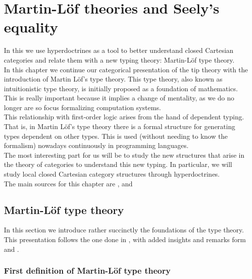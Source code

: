 
\chapter{Martin-L\"of theories and Seely's equality}
\label{chap:5}
\thispagestyle{empty}

In this we use hyperdoctrines as a tool to better understand closed Cartesian categories and relate them with a new typing theory: Martin-Löf type theory.\\

In this chapter we continue our categorical presentation of the tip theory with the introduction of Martin L\"of's type theory. This type theory, also known as intuitionistic type theory, is initially proposed as a foundation of mathematics. This is really important because it implies a change of mentality, as we do no longer are so focus formalizing computation systems. \\

This relationship with first-order logic arises from the hand of dependent typing. That is, in Martin Löf's type theory there is a formal structure for generating types dependent on other types. This is used (without needing to know the formalism) nowadays continuously in programming languages. \\

The most interesting part for us will be to study the new structures that arise in the theory of categories to understand this new typing. In particular, we will study local closed Cartesian category structures through hyperdoctrines. \\

The main sources for this chapter are  \cite{seely1984locally}, \cite{martinlof1973intuitionistic}  and \cite{mac2013categories}



\section{Martin-Löf type theory}

In this section we introduce rather succinctly the foundations of the type theory. This presentation follows the one done in \cite{seely1984locally}, with added insights and remarks form \cite{martinlof1973intuitionistic} and \cite{sep-type-theory-intuitionistic}.



\subsection{First definition of Martin-Löf type theory}

